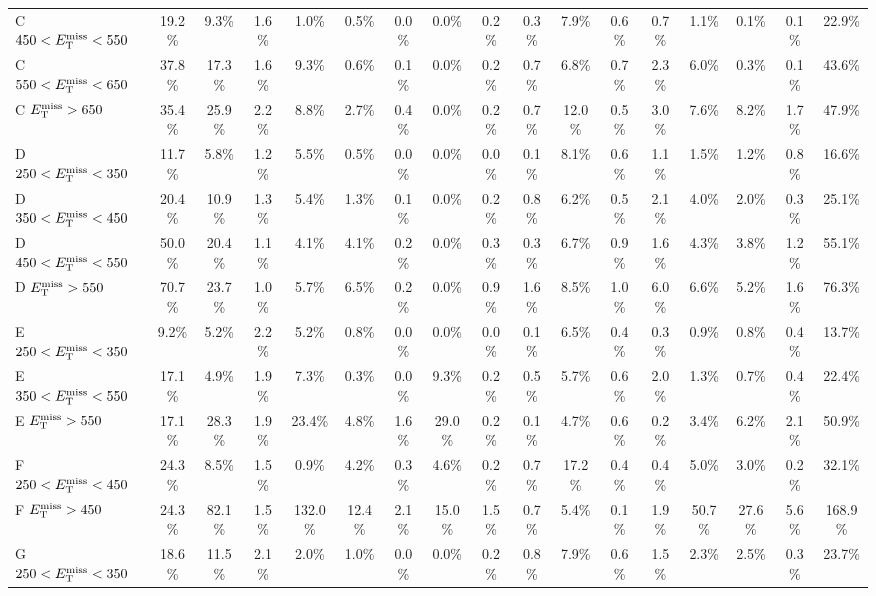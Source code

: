 \begin{table}
\begin{tabular}{| l | c c | c c c c c c c c c c c c c | c |}
 C  $450<E_\text{T}^\text{miss}<550$  & 19.2\%  & 9.3\%  & 1.6\%  & 1.0\%  & 0.5\%  & 0.0\%  & 0.0\%  & 0.2\%  & 0.3\%  & 7.9\%  & 0.6\%  & 0.7\%  & 1.1\%  & 0.1\%  & 0.1\%  & 22.9\%  \\
 C  $550<E_\text{T}^\text{miss}<650$  & 37.8\%  & 17.3\%  & 1.6\%  & 9.3\%  & 0.6\%  & 0.1\%  & 0.0\%  & 0.2\%  & 0.7\%  & 6.8\%  & 0.7\%  & 2.3\%  & 6.0\%  & 0.3\%  & 0.1\%  & 43.6\%  \\
 C  $E_\text{T}^\text{miss} >650$  & 35.4\%  & 25.9\%  & 2.2\%  & 8.8\%  & 2.7\%  & 0.4\%  & 0.0\%  & 0.2\%  & 0.7\%  & 12.0\%  & 0.5\%  & 3.0\%  & 7.6\%  & 8.2\%  & 1.7\%  & 47.9\%  \\
\hline
 D  $250<E_\text{T}^\text{miss}<350$  & 11.7\%  & 5.8\%  & 1.2\%  & 5.5\%  & 0.5\%  & 0.0\%  & 0.0\%  & 0.0\%  & 0.1\%  & 8.1\%  & 0.6\%  & 1.1\%  & 1.5\%  & 1.2\%  & 0.8\%  & 16.6\%  \\
 D  $350<E_\text{T}^\text{miss}<450$  & 20.4\%  & 10.9\%  & 1.3\%  & 5.4\%  & 1.3\%  & 0.1\%  & 0.0\%  & 0.2\%  & 0.8\%  & 6.2\%  & 0.5\%  & 2.1\%  & 4.0\%  & 2.0\%  & 0.3\%  & 25.1\%  \\
 D  $450<E_\text{T}^\text{miss}<550$  & 50.0\%  & 20.4\%  & 1.1\%  & 4.1\%  & 4.1\%  & 0.2\%  & 0.0\%  & 0.3\%  & 0.3\%  & 6.7\%  & 0.9\%  & 1.6\%  & 4.3\%  & 3.8\%  & 1.2\%  & 55.1\%  \\
 D  $E_\text{T}^\text{miss} >550$  & 70.7\%  & 23.7\%  & 1.0\%  & 5.7\%  & 6.5\%  & 0.2\%  & 0.0\%  & 0.9\%  & 1.6\%  & 8.5\%  & 1.0\%  & 6.0\%  & 6.6\%  & 5.2\%  & 1.6\%  & 76.3\%  \\
\hline
 E  $250<E_\text{T}^\text{miss}<350$  & 9.2\%  & 5.2\%  & 2.2\%  & 5.2\%  & 0.8\%  & 0.0\%  & 0.0\%  & 0.0\%  & 0.1\%  & 6.5\%  & 0.4\%  & 0.3\%  & 0.9\%  & 0.8\%  & 0.4\%  & 13.7\%  \\
 E  $350<E_\text{T}^\text{miss}<550$  & 17.1\%  & 4.9\%  & 1.9\%  & 7.3\%  & 0.3\%  & 0.0\%  & 9.3\%  & 0.2\%  & 0.5\%  & 5.7\%  & 0.6\%  & 2.0\%  & 1.3\%  & 0.7\%  & 0.4\%  & 22.4\%  \\
 E  $E_\text{T}^\text{miss} >550$  & 17.1\%  & 28.3\%  & 1.9\%  & 23.4\%  & 4.8\%  & 1.6\%  & 29.0\%  & 0.2\%  & 0.1\%  & 4.7\%  & 0.6\%  & 0.2\%  & 3.4\%  & 6.2\%  & 2.1\%  & 50.9\%  \\
\hline
 F  $250<E_\text{T}^\text{miss}<450$  & 24.3\%  & 8.5\%  & 1.5\%  & 0.9\%  & 4.2\%  & 0.3\%  & 4.6\%  & 0.2\%  & 0.7\%  & 17.2\%  & 0.4\%  & 0.4\%  & 5.0\%  & 3.0\%  & 0.2\%  & 32.1\%  \\
 F  $E_\text{T}^\text{miss} >450$  & 24.3\%  & 82.1\%  & 1.5\%  & 132.0\%  & 12.4\%  & 2.1\%  & 15.0\%  & 1.5\%  & 0.7\%  & 5.4\%  & 0.1\%  & 1.9\%  & 50.7\%  & 27.6\%  & 5.6\%  & 168.9\%  \\
\hline
 G  $250<E_\text{T}^\text{miss}<350$  & 18.6\%  & 11.5\%  & 2.1\%  & 2.0\%  & 1.0\%  & 0.0\%  & 0.0\%  & 0.2\%  & 0.8\%  & 7.9\%  & 0.6\%  & 1.5\%  & 2.3\%  & 2.5\%  & 0.3\%  & 23.7\%  \\

\end{tabular}
\end{table}
